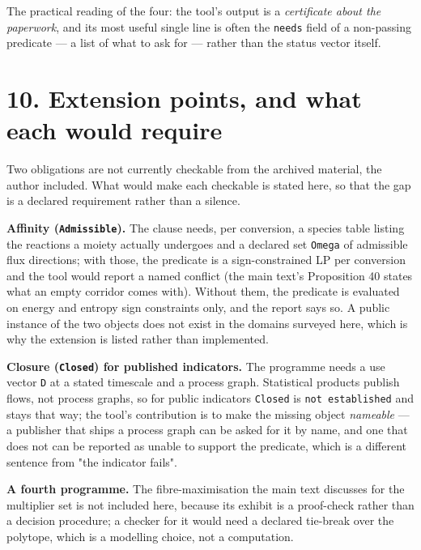 \documentclass[11pt]{article}
\begin{document}
The practical reading of the four: the tool's output is a \emph{certificate about the paperwork}, and its most useful single line is often the \texttt{needs} field of a non-passing predicate --- a list of what to ask for --- rather than the status vector itself.

\vspace{0.8em}

\section*{10. Extension points, and what each would require}\label{10-extension-points-and-what-each-would-require}

Two obligations are not currently checkable from the archived material, the author included. What would make each checkable is stated here, so that the gap is a declared requirement rather than a silence.

\textbf{Affinity (\texttt{Admissible}).} The clause needs, per conversion, a species table listing the reactions a moiety actually undergoes and a declared set \texttt{Omega} of admissible flux directions; with those, the predicate is a sign-constrained LP per conversion and the tool would report a named conflict (the main text's Proposition 40 states what an empty corridor comes with). Without them, the predicate is evaluated on energy and entropy sign constraints only, and the report says so. A public instance of the two objects does not exist in the domains surveyed here, which is why the extension is listed rather than implemented.

\textbf{Closure (\texttt{Closed}) for published indicators.} The programme needs a use vector \texttt{D} at a stated timescale and a process graph. Statistical products publish flows, not process graphs, so for public indicators \texttt{Closed} is \texttt{not established} and stays that way; the tool's contribution is to make the missing object \emph{nameable} --- a publisher that ships a process graph can be asked for it by name, and one that does not can be reported as unable to support the predicate, which is a different sentence from "the indicator fails".

\textbf{A fourth programme.} The fibre-maximisation the main text discusses for the multiplier set is not included here, because its exhibit is a proof-check rather than a decision procedure; a checker for it would need a declared tie-break over the polytope, which is a modelling choice, not a computation.
\end{document}
